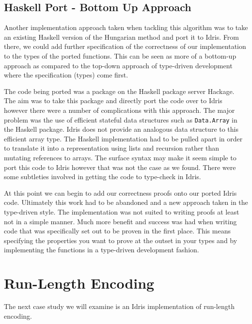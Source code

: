 \documentclass[a4paper, notitlepage]{report}
\begin{document}
\subsection{Haskell Port - Bottom Up Approach}
\label{sec:org49cdfa8}
Another implementation approach taken when tackling this algorithm was to take
an existing Haskell version of the Hungarian method and port it to Idris. From
there, we could add further specification of the correctness of our
implementation to the types of the ported functions. This can be seen as more of
a bottom-up approach as compared to the top-down approach of type-driven
development where the specification (types) come first.

The code being ported was a package \cite{komuves_munkres_2008} on the Haskell
package server Hackage. The aim was to take this package and directly port the
code over to Idris however there were a number of complications with this
approach. The major problem was the use of efficient stateful data structures
such as \texttt{Data.Array} in the Haskell package. Idris does not provide an analogous
data structure to this efficient array type. The Haskell implementation had to
be pulled apart in order to translate it into a representation using lists and
recursion rather than mutating references to arrays. The surface syntax may make
it seem simple to port this code to Idris however that was not the case as we
found. There were some subtleties involved in getting the code to type-check in
Idris.

At this point we can begin to add our correctness proofs onto our ported Idris
code. Ultimately this work had to be abandoned and a new approach taken in the
type-driven style. The implementation was not suited to writing proofs at least
not in a simple manner. Much more benefit and success was had when writing code
that was specifically set out to be proven in the first place. This means
specifying the properties you want to prove at the outset in your types and by
implementing the functions in a type-driven development fashion.

\section{Run-Length Encoding}
\label{sec:orge21442c}
The next case study we will examine is an Idris implementation of run-length
encoding.
\end{document}
